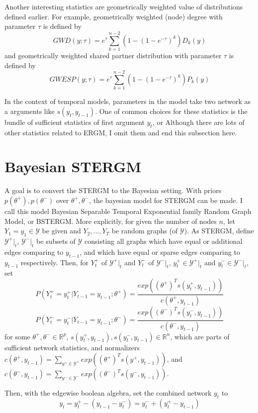 \documentclass[aspectratio=169,ignorenonframetext,9pt]{beamer}
\theoremstyle{plain}
\theoremstyle{definition}
\begin{document}
Another interesting statistics are geometrically weighted value of distributions defined earlier.
For example, geometrically weighted (node) degree with parameter $\tau$ is defined by
\[GWD(y;\tau)=e^{\tau} \sum_{k=1}^{n-2} (1-(1-e^{-\tau})^k)D_k(y)\]
and geometrically weighted shared partner distribution with parameter $\tau$ is defined by
\[GWESP(y;\tau)=e^{\tau} \sum_{k=1}^{n-2} (1-(1-e^{-\tau})^k)P_k(y)\]


In the context of temporal models, parameters in the model take two network as a arguments like $s(y_t,y_{t-1})$.
One of common choices for these statistics is the bundle of sufficient statistics of first argument $y_t$, or
Although there are lots of other statistics related to ERGM, I omit them and end this subsection here.


\section{Bayesian STERGM}
A goal is to convert the STERGM to the Bayesian setting.
With priors $p(\theta^+),p(\theta^-)$ over $\theta^+,\theta^-$,
the bayesian model for STERGM can be made. I call this model Bayesian Separable Temporal Exponential family Random Graph Model,
or BSTERGM. More explicitly, for given the number of nodes $n$, let $Y_1=y_1 \in \mathcal{Y}$ be given and $Y_2,...,Y_T$ be random graphs (of $\mathcal{Y}$).
As STERGM, define $\mathcal{Y}^+|_t$, $\mathcal{Y}^-|_t$ be subsets of $\mathcal{Y}$ consisting all graphs which have equal or additional edges comparing to $y_{t-1}$,
and which have equal or sparse edges comparing to $y_{t-1}$ respectively.
Then, for $Y_t^+$ of $\mathcal{Y}^+|_t$ and $Y_t^-$ of $\mathcal{Y}^-|_t$, $y_t^+ \in \mathcal{Y}^+|_t$ and $y_t^- \in \mathcal{Y}^-|_t$, set
\[P(Y_t^+=y_t^+|Y_{t-1}=y_{t-1};\theta^+) = \frac{exp((\theta^+)^{T}s(y_t^+, y_{t-1}))}{c(\theta^+, y_{t-1})}\]
\[P(Y_t^-=y_t^-|Y_{t-1}=y_{t-1};\theta^-) = \frac{exp((\theta^-)^{T}s(y_t^-, y_{t-1}))}{c(\theta^-, y_{t-1})}\]
for some $\theta^+,\theta^-\in\mathbb{R}^p$, $s(y_t^+, y_{t-1}), s(y_t^-, y_{t-1})\in\mathbb{R}^n$, which are parts of sufficient network statistics,
and normalizers $c(\theta^+, y_{t-1})=\sum_{y^+\in\mathcal{Y}^+}exp((\theta^+)^{T}s(y^+, y_{t-1}))$, 
and $c(\theta^-, y_{t-1})=\sum_{y^-\in\mathcal{Y}^-}exp((\theta^-)^{T}s(y^-, y_{t-1}))$.

Then, with the edgewise boolean algebra, set the combined network $y_t$ to
\[y_t=y_t^+ - (y_{t-1} - y_t^-) = y_t^- + (y_t^+ - y_{t-1})\]
\end{document}
